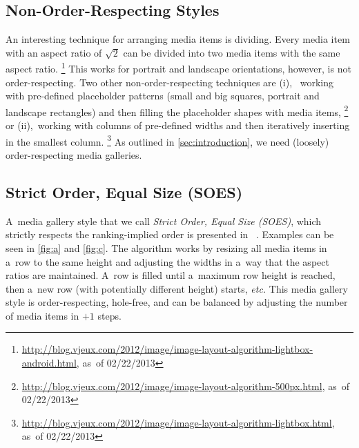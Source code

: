 \documentclass{sig-alt-release2}
\newcommand{\inlinelistingsize}{\fontsize{8pt}{11pt}}
\let\oldurl\url
\renewcommand{\url}[1]{\inlinelistingsize\oldurl{#1}}
\begin{document}
\subsection{Non-Order-Respecting Styles}

An interesting technique for arranging media items is dividing.
Every media item with an aspect ratio of $ \sqrt2 $ can be divided
into two media items with the same aspect ratio.%
\footnote{\url{http://blog.vjeux.com/2012/image/image-layout-algorithm-lightbox-android.html},
as~of 02/22/2013}
This works for portrait and landscape orientations,
however, is not order-respecting.
Two other non-order-respecting techniques are (i),~%
working with pre-defined placeholder patterns
(small and big squares, portrait and landscape rectangles)
and then filling the placeholder shapes with media items,%
\footnote{\url{http://blog.vjeux.com/2012/image/image-layout-algorithm-500px.html},
as~of 02/22/2013}
or (ii),~working with columns of pre-defined widths
and then iteratively inserting in the smallest column.%
\footnote{\url{http://blog.vjeux.com/2012/image/image-layout-algorithm-lightbox.html},
as~of 02/22/2013}
As outlined in \autoref{sec:introduction},
we need (loosely) order-respecting media galleries.

\subsection{Strict Order, Equal Size (SOES)}

A~media gallery style that we call \emph{Strict Order, Equal Size (SOES)},
which strictly respects the ranking-implied order is presented in~%
\cite{chedeau2012googleplus}.
Examples can be seen in \autoref{fig:a} and \autoref{fig:c}.
The algorithm works by resizing all media items in a~row to the same height
and adjusting the widths in a~way that the aspect ratios are maintained.
A~row is filled until a~maximum row height is reached,
then a~new row (with potentially different height) starts, \emph{etc.}
This media gallery style is order-respecting, hole-free,
and can be balanced by adjusting the number
of media items in $+1$ steps.
\end{document}
